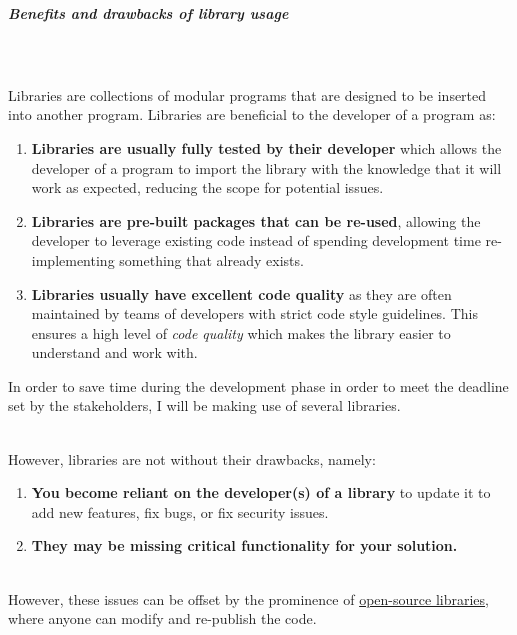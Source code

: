 \documentclass[../../main.tex]{subfiles}
\begin{document}
\subparagraph{Benefits and drawbacks of library usage}

\noindent \\\\ Libraries are collections of modular programs that are
designed to be inserted into another program. Libraries are beneficial
to the developer of a program as:

\begin{enumerate}[label=(\alph*)]
    \item \textbf{Libraries are usually fully tested by their developer}
          which allows the developer of a program to import the library with
          the knowledge that it will work as expected, reducing the scope
          for potential issues.

    \item \textbf{Libraries are pre-built packages that can be re-used},
          allowing the developer to leverage existing code instead of spending
          development time re-implementing something that already exists.

    \item \textbf{Libraries usually have excellent code quality}
          as they are often maintained by teams of developers with strict
          code style guidelines. This ensures a high level of \textit{code quality}
          which makes the library easier to understand and work with.
\end{enumerate}

\noindent In order to save time during the development phase in order to meet
the deadline set by the stakeholders, I will be making use of
several libraries.

\noindent \\ However, libraries are not without their drawbacks, namely:

\begin{enumerate}[label=(\alph*)]
    \item \textbf{You become reliant on the developer(s) of a library}
          to update it to add new features, fix bugs, or fix security issues.

    \item \textbf{They may be missing critical functionality for your solution.}
\end{enumerate}

\noindent \\ However, these issues can be offset by the prominence of
\underline{open-source libraries}, where anyone can modify
and re-publish the code.
\end{document}
